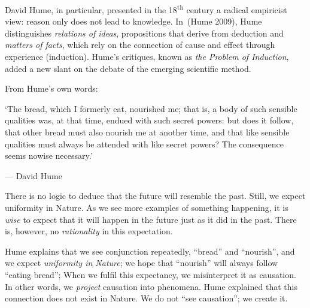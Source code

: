 \documentclass[
  letterpaper,
  12pt,
  british]{tufte-book}
\renewenvironment{quote}{
  \list{}{\leftmargin=3.5cm\topsep=0pt}
  \item\relax\small\itshape
}
{\endlist}
\theoremstyle{plain}
\theoremstyle{plain}
\theoremstyle{definition}
\theoremstyle{remark}
\begin{document}
David Hume, in particular, presented in the 18\textsuperscript{th}
century a radical empiricist view: reason only does not lead to
knowledge. In~(Hume
2009),
Hume distinguishes \emph{relations of ideas}, propositions that derive
from deduction and \emph{matters of facts}, which rely on the connection
of cause and effect through experience (induction). Hume's critiques,
known as \emph{the Problem of Induction}, added a new slant on the
debate of the emerging scientific method.

From Hume's own words:

\begin{quote}
`The bread, which I formerly eat, nourished me; that is, a body of such
sensible qualities was, at that time, endued with such secret powers:
but does it follow, that other bread must also nourish me at another
time, and that like sensible qualities must always be attended with like
secret powers? The consequence seems nowise necessary.'

--- David Hume
\end{quote}

There is no logic to deduce that the future will resemble the past.
Still, we expect uniformity in Nature. As we see more examples of
something happening, it is \emph{wise} to expect that it will happen in
the future just as it did in the past. There is, however, no
\emph{rationality} in this
expectation.

Hume explains that we see conjunction repeatedly, ``bread'' and
``nourish'', and we expect \emph{uniformity in Nature}; we hope that
``nourish'' will always follow ``eating bread''; When we fulfil this
expectancy, we misinterpret it as causation. In other words, we
\emph{project} causation into phenomena. Hume explained that this
connection does not exist in Nature. We do not ``see causation''; we
create it.
\end{document}
